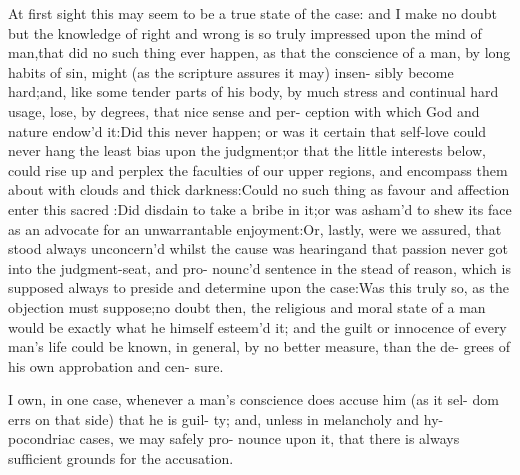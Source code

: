 \documentclass{article}
\begin{document}
\lqq At first sight this may seem to be a\break
\lqq true state of the case: and I make no\break
\lqq doubt but the knowledge of right and\break
\lqq wrong is so truly impressed upon the\break
\lqq mind of man,\tsk that did no such thing\break
\lqq ever happen, as that the conscience of\break
\lqq a man, by long habits of sin, might\break
\lqq (as the scripture assures it may) insen-\break
\lqq sibly become hard;\tsk and, like some\break
\lqq tender parts of his body, by much\break
\lqq stress and continual hard usage, lose,\break
\lqq by degrees, that nice sense and per-\break
\lqq ception with which God and nature\break 
\lqq endow’d it:\tsk Did this never happen;\break
\lqq \tsk or was it certain that self-love could\break
\lqq never hang the least bias upon the\break 
\lqq judgment;\tsk or that the little interests\break 
\lqq below, could rise up and perplex the\break
\lqq faculties of our upper regions, and
\lqq encompass them about with clouds and\break
\lqq thick darkness:\tsh Could no such\break
\lqq thing as favour and affection enter this\break
\lqq sacred :\tsk  Did  disdain to\break
\lqq take a bribe in it;\tsk or was asham’d to\break
\lqq shew its face as an advocate for an\break
\lqq unwarrantable enjoyment:\tsk Or, lastly,\break
\lqq were we assured, that  stood\break
\lqq always unconcern’d whilst the cause\break
\lqq was hearing\tsk and that passion never\break
\lqq got into the judgment-seat, and pro-\break
\lqq nounc’d sentence in the stead of reason,\break
\lqq which is supposed always to preside\break
\lqq and determine upon the case:\tsk Was\break
\lqq this truly so, as the objection must\break
\lqq suppose;\tsk no doubt then, the religious\break
\lqq and moral state of a man would be\break
\lqq exactly what he himself esteem’d it;\tsk\break
\lqq and the guilt or innocence of every\break
\lqq man’s life could be known, in general,\break
\lqq by no better measure, than the de-
\lqq grees of his own approbation and cen-\break
\lqq sure.

\lqq I own, in one case, whenever a man’s\break
\lqq conscience does accuse him (as it sel-\break
\lqq dom errs on that side) that he is guil-\break
\lqq ty; and, unless in melancholy and hy-\break
\lqq pocondriac cases, we may safely pro-\break
\lqq nounce upon it, that there is always\break
\lqq sufficient grounds for the accusation.
\end{document}
